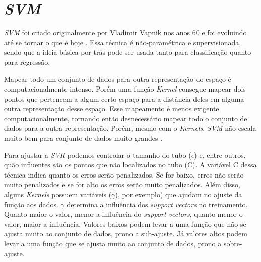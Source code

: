 
\section{\textit{\acrfull{SVM}}}

\textit{\acrshort{SVM}} foi criado originalmente por Vladimir Vapnik nos anos 60 e foi evoluindo até se tornar o que é hoje  \cite{Smola03atutorial}. Essa técnica é não-paramétrica e supervisionada, sendo que a ideia básica por trás pode ser usada tanto para classificação quanto para regressão.





Mapear todo um conjunto de dados para outra representação do espaço é computacionalmente intenso. Porém uma função \textit{Kernel} consegue mapear dois pontos que pertencem a algum certo espaço para a distância deles em alguma outra representação desse espaço. Esse mapeamento é menos exigente computacionalmente, tornando então desnecessário mapear todo o conjunto de dados para a outra representação. Porém, mesmo com o \textit{Kernels}, \textit{\acrshort{SVM}} não escala muito bem para conjunto de dados muito grandes \cite{chollet2018deep}.

Para ajustar a \textit{\acrshort{SVR}} podemos controlar o tamanho do tubo (\(\epsilon\)) e, entre outros, quão influentes são os pontos que não localizados no tubo (C). A variável C dessa técnica indica quanto os erros serão penalizados. Se for baixo, erros não serão muito penalizados e se for alto os erros serão muito penalizados. Além disso, alguns \textit{Kernels} possuem variáveis (\(\gamma\)), por exemplo) que ajudam no ajuste da função aos dados. \(\gamma\) determina a influência dos \textit{support vectors} no treinamento. Quanto maior o valor, menor a influência do \textit{support vectors}, quanto menor o valor, maior a influência. Valores baixos podem levar a uma função que não se ajusta muito ao conjunto de dados, prono a sub-ajuste. Já valores altos podem levar a uma função que se ajusta muito ao conjunto de dados, prono a sobre-ajuste.

